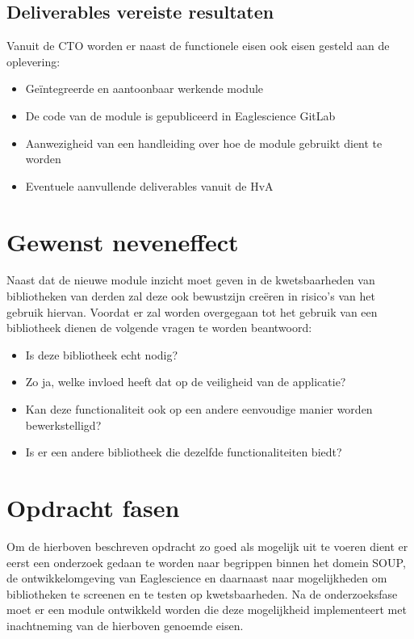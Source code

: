 \subsection{Deliverables vereiste resultaten}\label{subsec:deliverables-vereiste-resultaten}
Vanuit de CTO worden er naast de functionele eisen ook eisen gesteld aan de oplevering:
\begin{itemize}
\item Geïntegreerde en aantoonbaar werkende module
\item De code van de module is gepubliceerd in Eaglescience GitLab
\item Aanwezigheid van een handleiding over hoe de module gebruikt dient te worden
\item Eventuele aanvullende deliverables vanuit de HvA
\end{itemize}

\section{Gewenst neveneffect}\label{sec:gewenst-neveneffect}
Naast dat de nieuwe module inzicht moet geven in de kwetsbaarheden van bibliotheken van derden zal deze ook bewustzijn creëren in risico's van het gebruik hiervan. Voordat er zal worden overgegaan tot het gebruik van een bibliotheek dienen de volgende vragen te worden beantwoord:
\begin{itemize}
	\item Is deze bibliotheek echt nodig?
	\item Zo ja, welke invloed heeft dat op de veiligheid van de applicatie?
	\item Kan deze functionaliteit ook op een andere eenvoudige manier worden bewerkstelligd?
	\item Is er een andere bibliotheek die dezelfde functionaliteiten biedt?

\end{itemize}


\section{Opdracht fasen}\label{sec:opdracht-fasen}
Om de hierboven beschreven opdracht zo goed als mogelijk uit te voeren dient er eerst een onderzoek gedaan te worden naar begrippen binnen het domein SOUP, de ontwikkelomgeving van Eaglescience en daarnaast naar mogelijkheden om bibliotheken te screenen en te testen op kwetsbaarheden. Na de onderzoeksfase moet er een module ontwikkeld worden die deze mogelijkheid implementeert met inachtneming van de hierboven genoemde eisen.


